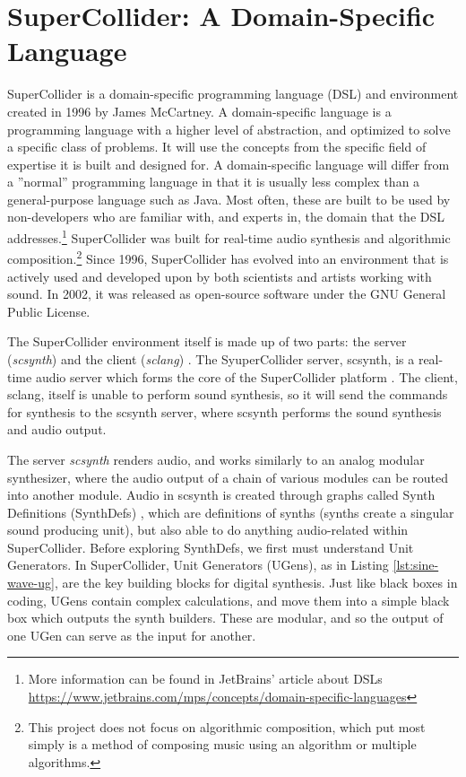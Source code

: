 \section[SuperCollider: A Domain-Specific Language]{SuperCollider: A Domain-Specific Language}\label{chapter:supercollider}

SuperCollider is a domain-specific programming language (DSL) and environment created in 1996 by James McCartney\cite{McCartney_2002}. A domain-specific language is a programming language with a higher level of abstraction, and optimized to solve a specific class of problems. It will use the concepts from the specific field of expertise it is built and designed for. A domain-specific language will differ from a ''normal'' programming language in that it is usually less complex than a general-purpose language such as Java. Most often, these are built to be used by non-developers who are familiar with, and experts in, the domain that the DSL addresses.\footnote{More information can be found in JetBrains' article about DSLs  \url{https://www.jetbrains.com/mps/concepts/domain-specific-languages}} SuperCollider was built for real-time audio synthesis and algorithmic composition.\footnote{This project does not focus on algorithmic composition, which put most simply is a method of composing music using an algorithm or multiple algorithms.} Since 1996, SuperCollider has evolved into an environment that is actively used and developed upon by both scientists and artists working with sound. In 2002, it was released as open-source software under the GNU General Public License.

The SuperCollider environment itself is made up of two parts: the server (\textit{scsynth}) and the client (\textit{sclang}) \cite{McCartney_2002}. The SyuperCollider server, scsynth, is a real-time audio server which forms the core of the SuperCollider platform \cite{McCartney_2021}. The client, sclang, itself is unable to perform sound synthesis, so it will send the commands for synthesis to the scsynth server, where scsynth performs the sound synthesis and audio output.

The server \textit{scsynth} renders audio, and works similarly to an analog modular synthesizer, where the audio output of a chain of various modules can be routed into another module. Audio in scsynth is created through graphs called Synth Definitions (SynthDefs) \cite{McCartney_2002}, which are definitions of synths (synths create a singular sound producing unit), but also able to do anything audio-related within SuperCollider. Before exploring SynthDefs, we first must understand Unit Generators. In SuperCollider, Unit Generators (UGens), as in Listing \ref{lst:sine-wave-ug}, are the key building blocks for digital synthesis. Just like black boxes in coding, UGens contain complex calculations, and move them into a simple black box which outputs the synth builders. These are modular, and so the output of one UGen can serve as the input for another. 

